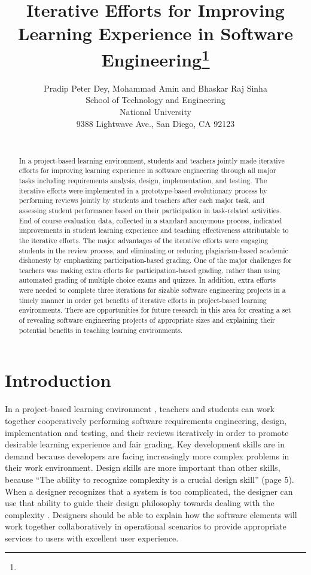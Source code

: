 \documentclass{article}
\title{Iterative Efforts for Improving Learning Experience in Software Engineering\footnote{\protect}
}
\author{
Pradip Peter Dey, Mohammad Amin and Bhaskar Raj Sinha\\
School of Technology and Engineering\\
National University\\
9388 Lightwave Ave., San Diego, CA 92123\\
\email{\{pdey, mamin, bsinha\}@nu.edu}\\
}
\begin{document}
\maketitle

\begin{abstract}
In a project-based learning environment, students and teachers jointly made iterative efforts for improving learning experience in software engineering through all major tasks including requirements analysis, design, implementation, and testing. The iterative efforts were implemented in a prototype-based evolutionary process 
by performing reviews jointly by students and teachers after each major task, and assessing student performance based on their participation in task-related activities. End of course evaluation data, collected in a standard anonymous process, indicated improvements in student learning experience and teaching effectiveness attributable to the iterative efforts. The major advantages of the iterative efforts were 
engaging students in the review process, and eliminating or reducing plagiarism-based academic dishonesty by emphasizing participation-based grading. One of the major challenges for teachers was making extra efforts for participation-based grading, rather than using automated grading of multiple choice exams and quizzes.  In 
addition, extra efforts were needed to complete three iterations for sizable software engineering projects in a timely manner in order get benefits of iterative efforts in project-based learning environments. There are opportunities for future research in this area for creating a set of revealing software engineering projects of appropriate sizes and explaining their potential benefits in teaching learning environments.   

\end{abstract}

\section{Introduction}
In a project-based learning environment \cite{guo}, teachers and students can work together cooperatively performing software requirements engineering, design, implementation and testing, and their reviews iteratively in 
order to promote desirable learning 
experience \cite{sokhan} and 
fair grading.  
Key development skills are in demand because developers are facing increasingly more complex problems in their work environment. Design skills are more important than other skills, because ``The ability to recognize complexity is a crucial design skill'' \cite{ouster} (page 5). When a designer recognizes that a system is too complicated, the designer can use that ability to guide their design philosophy towards dealing with the complexity \cite{ouster}.  Designers should be able to explain how the software elements will work together collaboratively in operational scenarios to provide appropriate services to users with excellent user experience. 
\end{document}
